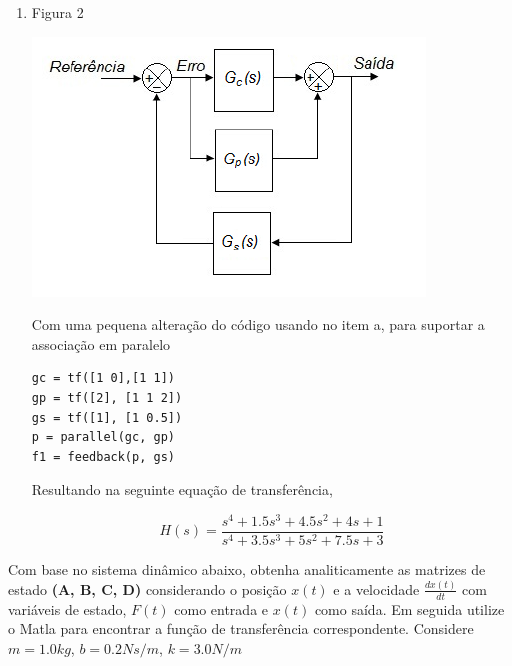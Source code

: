 \documentclass[a4paper, 10pt]{article}
\begin{document}
\begin{list}{\textbf{Questão .}}{
\setlength{\labelwidth}{-2mm} \setlength{\parsep}{0mm}
\setlength{\topsep}{0mm} \setlength{\leftmargin}{0mm}}
\begin{enumerate}
            $$
            H(s) = \frac{2 s^2 + s}{s^4 + 2.5 s^3 + 4 s^2 + 5.5 s + 1}
            $$


        \item
             Figura 2
            \begin{center}
            \includegraphics[scale=0.5]{fig5b.png}
            \end{center}
            
            Com uma pequena alteração do código usando no item a, para suportar
            a associação em paralelo

             \begin{lstlisting}
gc = tf([1 0],[1 1])
gp = tf([2], [1 1 2])
gs = tf([1], [1 0.5])
p = parallel(gc, gp)
f1 = feedback(p, gs)
             \end{lstlisting}

             Resultando na seguinte equação de transferência,

             $$
                H(s) = \frac{s^4 + 1.5 s^3 + 4.5 s^2 + 4 s + 1}{s^4 + 3.5 s^3 + 5 s^2 + 7.5 s + 3}
             $$


    \end{enumerate}


\newpage
\item
  Com base no sistema dinâmico abaixo, obtenha analiticamente as matrizes de estado
  \textbf{(A, B, C, D)} considerando o posição $x(t)$ e a velocidade $\frac{d x(t)}{dt}$
  com variáveis de estado, $F(t)$ como entrada e $x(t)$ como saída. Em seguida utilize
  o Matla para encontrar a função de transferência correspondente. Considere
  $m=1.0 kg$, $b=0.2 N s/m$, $k=3.0 N/m$


\end{list}
\end{document}
